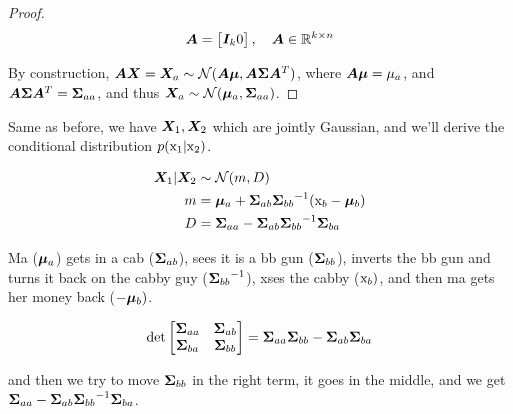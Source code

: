 \begin{tcolorbox}
\begin{proof}
    \begin{equation}
        {\bm{A}} = \begin{bmatrix} {\bm{I}}_k 0 \end{bmatrix}, \quad {\bm{A}} \in {\mathbb{R}}^{k \times n}
    \end{equation}
    
    By construction, ${\bm{A}} {\bm{X}} = {\bm{X}}_a \sim {\mathcal{N}}({\bm{A}} {\bm{\mu}}, {\bm{A}} {\bm{\Sigma}} {\bm{A}}^T)$, where ${\bm{A}} {\bm{\mu}} = \mu_a$, and ${\bm{A}} {\bm{\Sigma}} {\bm{A}}^T = {\bm{\Sigma}}_{aa}$, and thus ${\bm{X}}_a \sim {\mathcal{N}}({\bm{\mu}}_a, {\bm{\Sigma}}_{aa})$.
    
    \end{proof}
    
    \begin{thm}
    Same as before, we have ${\bm{X}}_1, {\bm{X}}_2$ which are jointly Gaussian, and we'll derive the conditional distribution $p({\textnormal{x}}_1 | {\textnormal{x}}_2)$.
    \end{thm}
    
    \begin{align}
        {\bm{X}}_1 | {\bm{X}}_2 & \sim {\mathcal{N}}(m, D) \\
        m &= {\bm{\mu}}_a + {{\bm{\Sigma}}_{ab}} {{\bm{\Sigma}}_{bb}}^{-1} ( {\textnormal{x}}_b - {\bm{\mu}}_b) \\
        D &= {{\bm{\Sigma}}_{aa}} - {{\bm{\Sigma}}_{ab}} {{\bm{\Sigma}}_{bb}}^{-1} {{\bm{\Sigma}}_{ba}}
    \end{align}
    
    Ma (${\bm{\mu}}_a$) gets in a cab (${{\bm{\Sigma}}_{ab}}$), sees it is a bb gun (${{\bm{\Sigma}}_{bb}}$), inverts the bb gun and turns it back on the cabby guy (${{\bm{\Sigma}}_{bb}}^{-1}$), xses the cabby (${\textnormal{x}}_b)$, and then ma gets her money back ($- {\bm{\mu}}_b)$.
    
    \begin{equation}
        \det \begin{bmatrix}
            {\bm{\Sigma}}_{aa} & {\bm{\Sigma}}_{ab} \\
            {\bm{\Sigma}}_{ba} & {\bm{\Sigma}}_{bb}
        \end{bmatrix} = {{\bm{\Sigma}}_{aa}} {{\bm{\Sigma}}_{bb}} - {{\bm{\Sigma}}_{ab}} {{\bm{\Sigma}}_{ba}}
    \end{equation}
    
    and then we try to move ${{\bm{\Sigma}}_{bb}}$ in the right term, it goes in the middle, and we get ${{\bm{\Sigma}}_{aa}} - {{\bm{\Sigma}}_{ab}} {{\bm{\Sigma}}_{bb}}^{-1} {{\bm{\Sigma}}_{ba}}$.

\end{tcolorbox}
